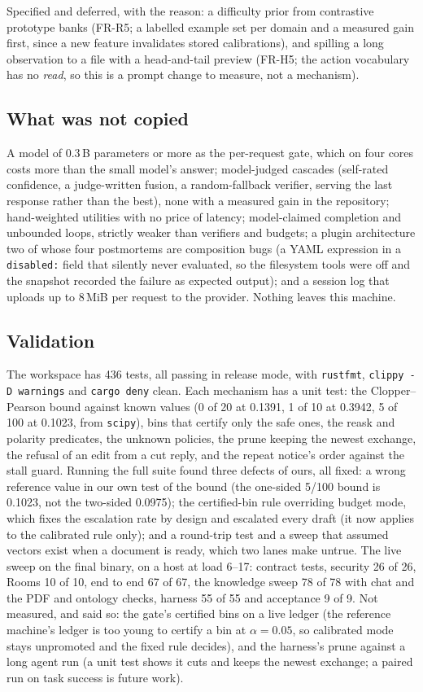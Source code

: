 Specified and deferred, with the reason: a difficulty prior from contrastive prototype banks (FR-R5; a labelled example set per domain and a measured gain
first, since a new feature invalidates stored calibrations), and spilling a long observation to a file with a head-and-tail preview (FR-H5; the action
vocabulary has no \emph{read}, so this is a prompt change to measure, not a mechanism).

\subsection{What was not copied}

A model of 0.3\,B parameters or more as the per-request gate, which on four cores costs more than the small model's answer; model-judged cascades
(self-rated confidence, a judge-written fusion, a random-fallback verifier, serving the last response rather than the best), none with a measured gain in
the repository; hand-weighted utilities with no price of latency; model-claimed completion and unbounded loops, strictly weaker than verifiers and budgets;
a plugin architecture two of whose four postmortems are composition bugs (a YAML expression in a \texttt{disabled:} field that silently never evaluated, so
the filesystem tools were off and the snapshot recorded the failure as expected output); and a session log that uploads up to 8\,MiB per request to the
provider. Nothing leaves this machine.

\subsection{Validation}

The workspace has 436 tests, all passing in release mode, with \texttt{rustfmt}, \texttt{clippy -D warnings} and \texttt{cargo deny} clean. Each
mechanism has a unit test: the Clopper--Pearson bound against known values (0 of 20 at 0.1391, 1 of 10 at 0.3942, 5 of 100 at 0.1023, from
\texttt{scipy}), bins that certify only the safe ones, the reask and polarity predicates, the unknown policies, the prune keeping the newest exchange, the
refusal of an edit from a cut reply, and the repeat notice's order against the stall guard. Running the full suite found three defects of ours, all
fixed: a wrong reference value in our own test of the bound (the one-sided 5/100 bound is 0.1023, not the two-sided 0.0975); the certified-bin rule
overriding budget mode, which fixes the escalation rate by design and escalated every draft (it now applies to the calibrated rule only); and a
round-trip test and a sweep that assumed vectors exist when a document is ready, which two lanes make untrue. The live sweep on the final binary, on a
host at load 6--17: contract tests, security 26 of 26, Rooms 10 of 10, end to end 67 of 67, the knowledge sweep 78 of 78 with chat and the PDF and
ontology checks, harness 55 of 55 and acceptance 9 of 9. Not measured, and said so: the gate's certified bins on a live ledger (the reference
machine's ledger is too young to certify a bin at $\alpha=0.05$, so calibrated mode stays unpromoted and the fixed rule decides), and the harness's prune
against a long agent run (a unit test shows it cuts and keeps the newest exchange; a paired run on task success is future work).
